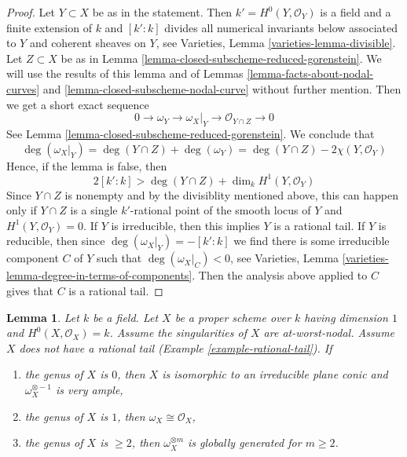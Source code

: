 \documentclass{stacks-project}
\theoremstyle{plain}
\newtheorem{lemma}[subsection]{Lemma}
\theoremstyle{definition}
\theoremstyle{remark}
\numberwithin{equation}{subsection}
\begin{document}
\begin{proof}
Let $Y \subset X$ be as in the statement. Then $k' = H^0(Y, \mathcal{O}_Y)$
is a field and a finite extension of $k$ and $[k' : k]$
divides all numerical invariants below associated to $Y$ and
coherent sheaves on $Y$, see
Varieties, Lemma \ref{varieties-lemma-divisible}.
Let $Z \subset X$ be as in
Lemma \ref{lemma-closed-subscheme-reduced-gorenstein}.
We will use the results of this lemma and of
Lemmas \ref{lemma-facts-about-nodal-curves} and
\ref{lemma-closed-subscheme-nodal-curve} without further mention.
Then we get a short exact sequence
$$
0 \to \omega_Y \to \omega_X|_Y \to \mathcal{O}_{Y \cap Z} \to 0
$$
See Lemma \ref{lemma-closed-subscheme-reduced-gorenstein}.
We conclude that
$$
\deg(\omega_X|_Y) = \deg(Y \cap Z) + \deg(\omega_Y) =
\deg(Y \cap Z) - 2\chi(Y, \mathcal{O}_Y)
$$
Hence, if the lemma is false, then
$$
2[k' : k] > \deg(Y \cap Z) + \dim_k H^1(Y, \mathcal{O}_Y)
$$
Since $Y \cap Z$ is nonempty and by the divisiblity mentioned above,
this can happen only if $Y \cap Z$ is a single $k'$-rational point
of the smooth locus of $Y$ and $H^1(Y, \mathcal{O}_Y) = 0$.
If $Y$ is irreducible, then this implies $Y$ is a rational tail.
If $Y$ is reducible, then since $\deg(\omega_X|_Y) = -[k' : k]$
we find there is some irreducible component $C$ of $Y$
such that $\deg(\omega_X|_C) < 0$, see
Varieties, Lemma \ref{varieties-lemma-degree-in-terms-of-components}.
Then the analysis above applied
to $C$ gives that $C$ is a rational tail.
\end{proof}

\begin{lemma}
\label{lemma-no-rational-tail-semiample-genus-geq-2}
Let $k$ be a field. Let $X$ be a proper scheme over $k$ having dimension $1$
and $H^0(X, \mathcal{O}_X) = k$. Assume the singularities of $X$ are
at-worst-nodal. Assume $X$ does not have a rational tail
(Example \ref{example-rational-tail}). If
\begin{enumerate}
\item the genus of $X$ is $0$, then $X$ is isomorphic to an
irreducible plane conic and $\omega_X^{\otimes -1}$ is very ample,
\item the genus of $X$ is $1$, then $\omega_X \cong \mathcal{O}_X$,
\item the genus of $X$ is $\geq 2$, then
$\omega_X^{\otimes m}$ is globally generated for $m \geq 2$.
\end{enumerate}
\end{lemma}
\end{document}

